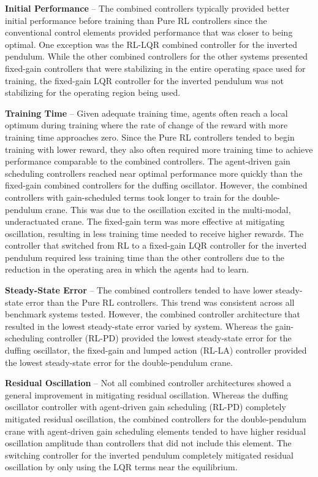 \textbf{Initial Performance} -- The combined controllers typically provided better initial performance before training than Pure RL controllers since the conventional control elements provided performance that was closer to being optimal. One exception was the RL-LQR combined controller for the inverted pendulum. While the other combined controllers for the other systems presented fixed-gain controllers that were stabilizing in the entire operating space used for training, the fixed-gain LQR controller for the inverted pendulum was not stabilizing for the operating region being used.

\textbf{Training Time} --  Given adequate training time, agents often reach a local optimum during training where the rate of change of the reward with more training time approaches zero. Since the Pure RL controllers tended to begin training with lower reward, they also often required more training time to achieve performance comparable to the combined controllers. The agent-driven gain scheduling controllers reached near optimal performance more quickly than the fixed-gain combined controllers for the duffing oscillator. However, the combined controllers with gain-scheduled terms took longer to train for the double-pendulum crane. This was due to the oscillation excited in the multi-modal, underactuated crane. The fixed-gain term was more effective at mitigating oscillation, resulting in less training time needed to receive higher rewards. The controller that switched from RL to a fixed-gain LQR controller for the inverted pendulum required less training time than the other controllers due to the reduction in the operating area in which the agents had to learn.

\textbf{Steady-State Error} -- The combined controllers tended to have lower steady-state error than the Pure RL controllers. This trend was consistent across all benchmark systems tested. However, the combined controller architecture that resulted in the lowest steady-state error varied by system. Whereas the gain-scheduling controller (RL-PD) provided the lowest steady-state error for the duffing oscillator, the fixed-gain and lumped action (RL-LA) controller provided the lowest steady-state error for the double-pendulum crane.

\textbf{Residual Oscillation} -- Not all combined controller architectures showed a general improvement in mitigating residual oscillation. Whereas the duffing oscillator controller with agent-driven gain scheduling (RL-PD) completely mitigated residual oscillation, the combined controllers for the double-pendulum crane with agent-driven gain scheduling elements tended to have higher residual oscillation amplitude than controllers that did not include this element. The switching controller for the inverted pendulum completely mitigated residual oscillation by only using the LQR terms near the equilibrium.

